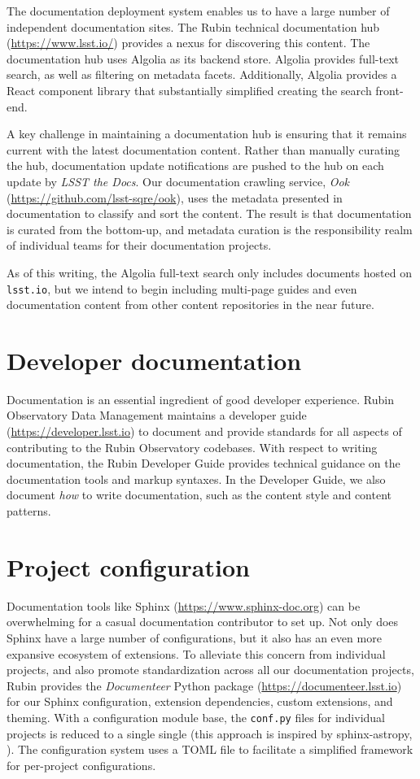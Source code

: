 \documentclass[11pt,twoside]{article}
\begin{document}
The documentation deployment system enables us to have a large number of independent documentation sites.
The Rubin technical documentation hub (\url{https://www.lsst.io/}) provides a nexus for discovering this content.
The documentation hub uses Algolia as its backend store.
Algolia provides full-text search, as well as filtering on metadata facets.
Additionally, Algolia provides a React component library that substantially simplified creating the search front-end.

A key challenge in maintaining a documentation hub is ensuring that it remains current with the latest documentation content.
Rather than manually curating the hub, documentation update notifications are pushed to the hub on each update by \textit{LSST the Docs}.
Our documentation crawling service, \textit{Ook} (\url{https://github.com/lsst-sqre/ook}), uses the metadata presented in documentation to classify and sort the content.
The result is that documentation is curated from the bottom-up, and metadata curation is the responsibility realm of individual teams for their documentation projects.

As of this writing, the Algolia full-text search only includes documents hosted on \texttt{lsst.io}, but we intend to begin including multi-page guides and even documentation content from other content repositories in the near future.

\section{Developer documentation}

Documentation is an essential ingredient of good developer experience.
Rubin Observatory Data Management maintains a developer guide (\url{https://developer.lsst.io}) to document and provide standards for all aspects of contributing to the Rubin Observatory codebases.
With respect to writing documentation, the Rubin Developer Guide provides technical guidance on the documentation tools and markup syntaxes.
In the Developer Guide, we also document \emph{how} to write documentation, such as the content style and content patterns.

\section{Project configuration}

Documentation tools like Sphinx (\url{https://www.sphinx-doc.org}) can be overwhelming for a casual documentation contributor to set up.
Not only does Sphinx have a large number of configurations, but it also has an even more expansive ecosystem of extensions.
To alleviate this concern from individual projects, and also promote standardization across all our documentation projects, Rubin provides the \textit{Documenteer} Python package (\url{https://documenteer.lsst.io}) for our Sphinx configuration, extension dependencies, custom extensions, and theming.
With a configuration module base, the \texttt{conf.py} files for individual projects is reduced to a single single (this approach is inspired by sphinx-astropy, \citet{thomas_robitaille_2023_8015243}).
The configuration system uses a TOML file to facilitate a simplified framework for per-project configurations.
\end{document}
